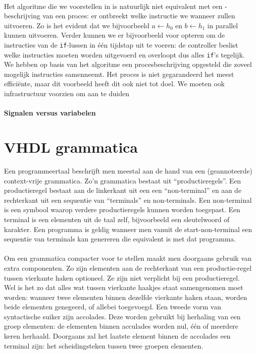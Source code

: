 \paragraph{}
Het algoritme die we voorstellen in  is natuurlijk niet equivalent met een \tvhdl{}-beschrijving van een proces: er ontbreekt welke instructie we wanneer zullen uitvoeren. Zo is het evident dat we bijvoorbeeld $a\gets h_0$ en $b\gets h_1$ in parallel kunnen uitvoeren. Verder kunnen we er bijvoorbeeld voor opteren om de instructies van de \texttt{if}-lussen in \'e\'en tijdstap uit te voeren: de controller beslist welke instructies moeten worden uitgevoerd en overloopt dus alles \texttt{if}'s tegelijk. We hebben op basis van het algoritme een procesbeschrijving opgesteld die zoveel mogelijk instructies samenneemt. Het proces is niet gegarandeerd het meest effici\"ente, maar dit voorbeeld heeft dit ook niet tot doel. We moeten ook infrastructuur voorzien om aan te duiden 


\paragraph{Signalen versus variabelen}

\section{VHDL grammatica}
Een programmeertaal beschrijft men meestal aan de hand van een (geannoteerde) context-vrije grammatica. Zo'n grammatica bestaat uit ``productieregels''. Een productieregel bestaat aan de linkerkant uit een een ``non-terminal'' en aan de rechterkant uit een sequentie van ``terminals'' en non-terminals. Een non-terminal is een symbool waarop verdere productieregels kunnen worden toegepast. Een terminal is een elementen uit de taal zelf, bijvoorbeeld een sleutelwoord of karakter. Een programma is geldig wanneer men vanuit de start-non-terminal een sequentie van terminals kan genereren die equivalent is met dat programma.

\paragraph{}
Om een grammatica compacter voor te stellen maakt men doorgaans gebruik van extra componenten. Zo zijn elementen aan de rechterkant van een productie-regel tussen vierkante haken optioneel. Ze zijn niet verplicht bij een productieregel. Wel is het zo dat alles wat tussen vierkante haakjes staat samengenomen moet worden: wanneer twee elementen binnen dezelfde vierkante haken staan, worden beide elementen genegeerd, of allebei toegevoegd. Een tweede vorm van syntactische suiker zijn accolades. Deze worden gebruikt bij herhaling van een groep elementen: de elementen binnen acculades worden nul, \'e\'en of meerdere keren herhaald. Doorgaans zal het laatste element binnen de accolades een terminal zijn: het scheidingsteken tussen twee groepen elementen.

